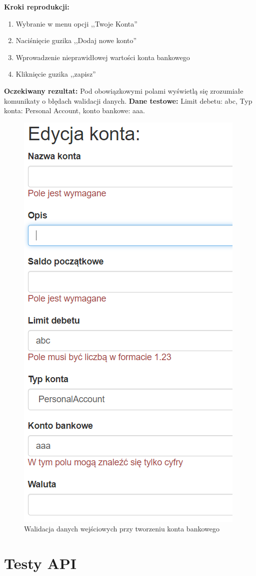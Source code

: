 \begin{enumerate}[labelwidth=1em,label=\Roman*]
    \textbf{Kroki reprodukcji:}  \begin{enumerate}[label=\arabic*.]
        \item Wybranie w menu opcji ,,Twoje Konta''
        \item Naciśnięcie guzika ,,Dodaj nowe konto''
        \item Wprowadzenie nieprawidłowej wartości konta bankowego
        \item Kliknięcie guzika ,,zapisz''
    \end{enumerate}
    \textbf{Oczekiwany rezultat:}  Pod obowiązkowymi polami wyświetlą się zrozumiałe komunikaty o błędach walidacji danych. \newline
    \textbf{Dane testowe:} Limit debetu: abc, Typ konta: Personal Account, konto bankowe: aaa. 
\end{enumerate}

\begin{figure}[b]
	\centering
	\includegraphics[width=.5\linewidth]{rys05/validation-client-1.PNG}
	\caption{Walidacja danych wejściowych przy tworzeniu konta bankowego}
	\label{fig:client-test-1}
\end{figure}

\section{Testy API}
\label{sec:test-api}


